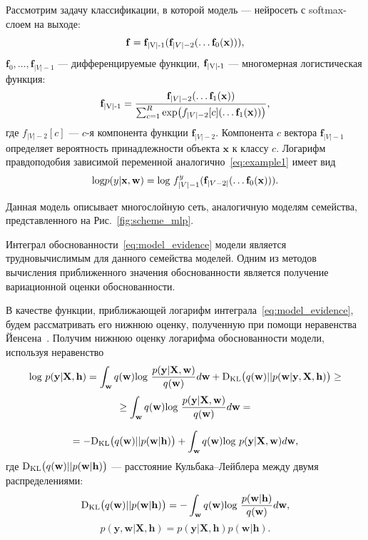 \begin{example}
Рассмотрим задачу классификации, в которой модель --- нейросеть с softmax-слоем на выходе:
\begin{equation}
\label{eq:softmax_example}
\mathbf{f} = \mathbf{f}_\textnormal{|V|-1}(\mathbf{f}_{|V|-2}(\dots \mathbf{f}_0(\mathbf{x}))),
\end{equation}
$\mathbf{f}_0, \dots, \mathbf{f}_{|V|-1}$ --- дифференцируемые функции, $\mathbf{f}_\textnormal{|V|-1}$ --- многомерная логистическая функция:
\begin{equation}
\label{eq:proba_softmax}
	\mathbf{f}_\textnormal{|V|-1} = \frac{\mathbf{f}_{|V|-2}(\dots \mathbf{f}_1(\mathbf{x}))}{\sum_{c=1}^R \textnormal{exp}\bigl( {f}_{|V|-2}[c](\dots \mathbf{f}_1(\mathbf{x})) \bigr)},
\end{equation}
где ${f}_{|V|-2}[c]$ --- $c$-я компонента функции $\mathbf{f}_{|V|-2}$. Компонента $c$ вектора $\mathbf{f}_{|V|-1}$ определяет вероятность принадлежности объекта $\mathbf{x}$ к классу $c$. Логарифм правдоподобия зависимой переменной аналогично~\eqref{eq:example1} имеет вид
\[
	\textnormal{log} p({y}|\mathbf{x}, \mathbf{w}) =  \textnormal{log}~{f}^{y}_{|V|-1} (\mathbf{f}_{|V-2|}(\dots \mathbf{f}_0(\mathbf{x}))).
\]

Данная модель описывает многослойную сеть, аналогичную моделям семейства, представленного на Рис.~\ref{fig:scheme_mlp}.
\end{example}

Интеграл обоснованности~\eqref{eq:model_evidence} модели является трудновычислимым для данного семейства моделей. Одним из методов вычисления приближенного значения обоснованности является получение вариационной оценки обоснованности.  


{В качестве функции, приближающей логарифм интеграла~\eqref{eq:model_evidence}, будем рассматривать его нижнюю оценку, полученную при помощи неравенства Йенсена~\cite{bishop}. Получим нижнюю оценку логарифма обоснованности модели, используя неравенство}
\begin{equation} 
\label{eq:var_elbo}
\textnormal{log}~p(\mathbf{y}|\mathbf{X},\mathbf{h})  = \int_{\mathbf{w}} q(\mathbf{w})\textnormal{log}~\frac{p(\mathbf{y}|\mathbf{X},\mathbf{w})}{q(\mathbf{w})}d\mathbf{w} + \textnormal{D}_\textnormal{KL}  \bigl(q(\mathbf{w})||p(\mathbf{w}|\mathbf{y}, \mathbf{X}, \mathbf{h})\bigr) \geq	
\end{equation} 
$$
\geq \int_{\mathbf{w}} q(\mathbf{w})\textnormal{log}~\frac{p(\mathbf{y}|\mathbf{X},\mathbf{w})}{q(\mathbf{w})}d\mathbf{w} =
$$

$$
= -\textnormal{D}_\textnormal{KL} \bigl(q(\mathbf{w})||p(\mathbf{w}|\mathbf{h})\bigr) + \int_{\mathbf{w}} q(\mathbf{w})\textnormal{log}~{p(\mathbf{y}|\mathbf{X},\mathbf{w})} d \mathbf{w},
$$
где $\textnormal{D}_\textnormal{KL}\bigl(q(\mathbf{w})||p(\mathbf{w} |\mathbf{h})\bigr)$ --- расстояние Кульбака--Лейблера между двумя распределениями: $$\textnormal{D}_\textnormal{KL}\bigl(q(\mathbf{w})||p(\mathbf{w} |\mathbf{h})\bigr) = -\int_{\mathbf{w}} q(\mathbf{w})\textnormal{log}~\frac{p(\mathbf{w} | \mathbf{h})}{q(\mathbf{w})}d\mathbf{w},$$
$$
p(\mathbf{y},\mathbf{w}|\mathbf{X},\mathbf{h}) = p(\mathbf{y}|\mathbf{X},\mathbf{h})p(\mathbf{w}|\mathbf{h}).
$$

